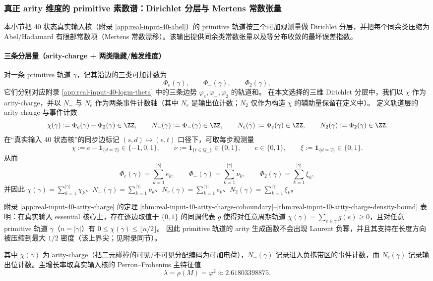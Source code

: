 \subsubsection{真正 arity 维度的 primitive 素数谱：Dirichlet 分层与 Mertens 常数张量}\label{subsec:arity-dirichlet-mertens-tensor}
本小节把 40 状态真实输入核（附录 \ref{app:real-input-40-abel}）的 primitive 轨道按三个可加观测量做 Dirichlet 分层，并把每个同余类压缩为 Abel/Hadamard 有限部常数项（Mertens 常数漂移）。该输出提供同余类常数张量以及等分布收敛的最坏误差指数。

\paragraph{三条分层量（arity-charge + 两类隐藏/触发维度）}
对一条 primitive 轨道 $\gamma$，记其沿边的三类可加计数为
$$
\Phi_e(\gamma),\qquad \Phi_-(\gamma),\qquad \Phi_2(\gamma),
$$
它们分别对应附录 \ref{app:real-input-40-logm-theta} 中的三条边势 $\varphi_e,\varphi_-,\varphi_2$ 的轨道和。
在本文选择的三维 Dirichlet 分层中，我们以 $\chi$ 作为 arity-charge，并以 $N_-$ 与 $N_e$ 作为两条事件计数轴（其中 $N_e$ 是输出位计数；$N_2$ 仅作为构造 $\chi$ 的辅助量保留在定义中）。
定义轨道层的 arity-charge 与事件计数
$$
\chi(\gamma):=\Phi_e(\gamma)-\Phi_2(\gamma)\in\ZZ,
\qquad
N_-(\gamma):=\Phi_-(\gamma)\in\ZZ,
\qquad
N_e(\gamma):=\Phi_e(\gamma)\in\ZZ,
\qquad
N_2(\gamma):=\Phi_2(\gamma)\in\ZZ.
$$
在“真实输入 40 状态核”的同步边标记 $(s,d)\mapsto(e,t)$ 口径下，可取每步观测量
$$
\chi:=e-\mathbf{1}_{\{d=2\}}\in\{-1,0,1\},
\qquad
\nu:=\mathbf{1}_{\{t\in Q_-\}}\in\{0,1\},
\qquad
e\in\{0,1\},
\qquad
\xi:=\mathbf{1}_{\{d=2\}}\in\{0,1\}.
$$
从而
$$
\Phi_e(\gamma)=\sum_{k=1}^{|\gamma|} e_k,
\qquad
\Phi_-(\gamma)=\sum_{k=1}^{|\gamma|} \nu_k,
\qquad
\Phi_2(\gamma)=\sum_{k=1}^{|\gamma|} \xi_k,
$$
并因此 $\chi(\gamma)=\sum_{k=1}^{|\gamma|}\chi_k$、$N_-(\gamma)=\sum_{k=1}^{|\gamma|}\nu_k$、$N_e(\gamma)=\sum_{k=1}^{|\gamma|}e_k$、$N_2(\gamma)=\sum_{k=1}^{|\gamma|}\xi_k$。

\begin{remark}\label{rem:arity-charge-nonneg-density}
附录 \ref{app:real-input-40-arity-charge} 的定理
\ref{thm:real-input-40-arity-charge-coboundary}--\ref{thm:real-input-40-arity-charge-density-bound}
表明：在真实输入 essential 核心上，存在逐边取值于 $\{0,1\}$ 的同调代表 $g$ 使得对任意周期轨道
\(
\chi(\gamma)=\sum_{e\in\gamma}g(e)\ge 0
\)，且对任意 primitive 轨道 $\gamma$（$n=|\gamma|$）有
\(
0\le \chi(\gamma)\le \lfloor n/2\rfloor
\)。
因此 primitive 轨道的 arity 生成函数不会出现 Laurent 负幂，并且其支持在长度方向被压缩到最大 $1/2$ 密度（该上界尖；见附录同节）。
\end{remark}
其中 $\chi(\gamma)$ 为 arity-charge（把二元碰撞的可见/不可见分配编码为可加电荷），$N_-(\gamma)$ 记录进入负携带区的事件计数，而 $N_e(\gamma)$ 记录输出位计数。主增长率取真实输入核的 Perron--Frobenius 主特征值
$$
\lambda=\rho(M)=\varphi^2\approx 2.61803398875.
$$


